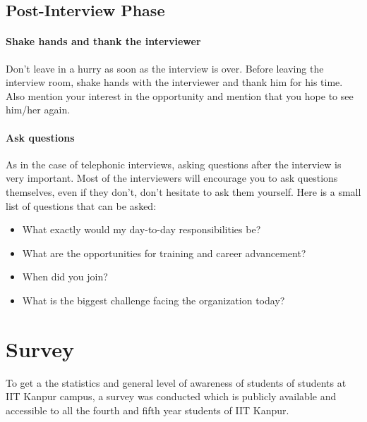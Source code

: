 \documentclass[a4paper,12pt]{report}
\begin{document}
\section{Post-Interview Phase}
\subsubsection{Shake hands and thank the interviewer}
Don't leave in a hurry as soon as the interview is over.
Before leaving the interview room, shake hands with the interviewer and thank him for his time. Also mention 
your interest in the opportunity and mention that you hope to see him/her again.
\subsubsection{Ask questions}
As in the case of telephonic interviews, asking questions after the interview is very important. Most of the interviewers
will encourage you to ask questions themselves, even if they don't, don't hesitate to ask them yourself.
Here is a small list of questions that can be asked\cite{lifehack}:
\begin{itemize}
 \item What exactly would my day-to-day responsibilities be?
 \item What are the opportunities for training and career advancement?
 \item When did you join?
 \item What is the biggest challenge facing the organization today?
\end{itemize}

\chapter{Survey}
To get a the statistics and general level of awareness of students of students at IIT Kanpur campus, a
survey was conducted which is publicly available and accessible to all the fourth and fifth year 
students of IIT Kanpur.
\end{document}
